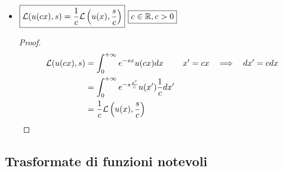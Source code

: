 \begin{itemize}
\begin{proof}
\begin{equation*}
\Lc\left(e^{s_{0} x} u(x), s\right) = \int^{+ \infty}_{0} e^{- x(s - s_{0})} u(x) dx = \Lc(u(x), s - s_{0})
\end{equation*}
\end{proof}
\item $\boxed{\mathcal{L}(u(cx), s) = \frac{1}{c}\mathcal{L}\left(u(x), \frac{s}{c}\right)}$ $\boxed{c\in \mathbb{R}, c > 0}$

\begin{proof}
\begin{align*}
\mathcal{L}(u(cx), s) & = \int^{+ \infty}_{0} e^{- sx} u(cx) dx & x' = cx\ \ \implies \ \ dx' = cdx\\
 & = \int^{+ \infty}_{0} e^{- s\frac{x'}{c}} u(x')\frac{1}{c} dx' & \\
 & = \frac{1}{c}\mathcal{L}\left(u(x), \frac{s}{c}\right) &
\end{align*}
\end{proof}
\end{itemize}

\subsection{Trasformate di funzioni notevoli}

